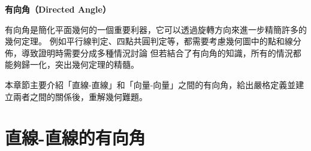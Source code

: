 \documentclass[12pt]{article}
\begin{document}
\thispagestyle{fancy}  %
\begin{center}
    \textbf{\Large{有向角（Directed Angle）}}
\end{center}

\indent 有向角是簡化平面幾何的一個重要利器，它可以透過旋轉方向來進一步精簡許多的幾何定理。
例如平行線判定、四點共圓判定等，都需要考慮幾何圖中的點和線分佈，導致證明時需要分成多種情況討論
但若結合了有向角的知識，所有的情況都能夠歸一化，突出幾何定理的精髓。

本章節主要介紹「直線-直線」和「向量-向量」之間的有向角，給出嚴格定義並建立兩者之間的關係後，重解幾何難題。

\begin{quotation}
    \centering
\end{quotation}
\section{直線-直線的有向角}
\end{document}
